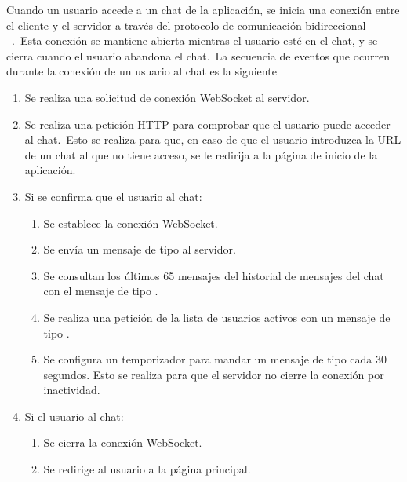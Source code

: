 
Cuando un usuario accede a un chat de la aplicación, se inicia una conexión entre el cliente y el servidor a través
del protocolo de comunicación bidireccional ~\cite{RFCWebSocket}.\ Esta conexión se mantiene
abierta mientras el
usuario esté en el chat, y se cierra cuando el usuario abandona el chat.\ La secuencia de eventos que ocurren durante
la conexión de un usuario al chat es la siguiente


\begin{enumerate}
	\item Se realiza una solicitud de conexión WebSocket al servidor.
	\item Se realiza una petición HTTP para comprobar que el usuario puede acceder al chat.\ Esto se realiza para
	que, en caso de que el usuario introduzca la URL de un chat al que no tiene acceso, se le redirija a la página
	de inicio de la aplicación.
	\item Si se confirma que el usuario  al chat:
	\begin{enumerate}
		\item Se establece la conexión WebSocket.
		\item Se envía un mensaje de tipo  al servidor.
		\item Se consultan los últimos 65 mensajes del historial de mensajes del chat con el mensaje de tipo
		.
		\item Se realiza una petición de la lista de usuarios activos con un mensaje de tipo
		.
		\item Se configura un temporizador para mandar un mensaje de tipo  cada 30 segundos.
		Esto se realiza para que el servidor no cierre la conexión por inactividad.
	\end{enumerate}
	\item Si el usuario  al chat:
	\begin{enumerate}
		\item Se cierra la conexión WebSocket.
		\item Se redirige al usuario a la página principal.
	\end{enumerate}
\end{enumerate}
\label{itm:frontend-connection-life-cycle}

